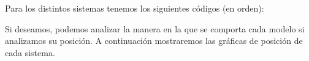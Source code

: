 \documentclass[12pt, letterpaper]{article}
\begin{document}
Para los distintos sistemas tenemos los siguientes códigos (en orden):
\vspace{1cm}







Si deseamos, podemos analizar la manera en la que se comporta cada modelo si analizamos su posición. A continuación mostraremos las gráficas de posición de cada sistema.
\end{document}
